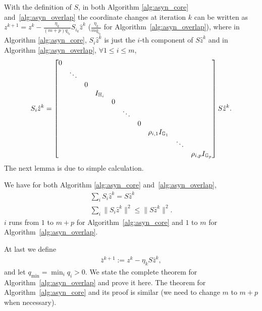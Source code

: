 {With the definition of $S$, in both Algorithm \ref{alg:asyn_core} and~\ref{alg:asyn_overlap} the coordinate changes at iteration $k$ can be written as $z^{k+1}=z^k-\frac{\eta_k}{(m+p)q_{i_k}}S_{i_k}\hat{z}^k$ ($\frac{\eta_k}{mq_{i_k}}$ for Algorithm~\ref{alg:asyn_overlap}), where in Algorithm \ref{alg:asyn_core}, $S_{i}\hat{z}^k$ is just the $i$-th component of $S\hat{z}^k$ and in Algorithm \ref{alg:asyn_overlap}, $\forall 1\leq i\leq m$,
$$S_{i}\hat{z}^k=\begin{bmatrix}
0&&&&&&&&&\\
&\ddots&&&&&&&&\\
&&0&&&&&&&\\
&&&I_{\HH_i}&&&&&&\\
&&&&0&&&&&\\
&&&&&\ddots&&&&\\
&&&&&&0&&&\\
&&&&&&&\rho_{i,1}I_{\GG_1}&&\\
&&&&&&&&\ddots&\\
&&&&&&&&&\rho_{i,p}I_{\GG_p}
\end{bmatrix}S\hat{z}^k.$$
The next lemma is due to simple calculation.
\begin{lemma}
We have for both Algorithm \ref{alg:asyn_core} and~\ref{alg:asyn_overlap},
\begin{align*}
\sum_{i}S_i\hat{z}^k=S\hat{z}^k\\
\sum_{i}\|S_i\hat{z}^k\|^2\leq\|S\hat{z}^k\|^2.
\end{align*}
$i$ runs from $1$ to $m+p$ for Algorithm~\ref{alg:asyn_core} and $1$ to $m$ for Algorithm~\ref{alg:asyn_overlap}.
\end{lemma}
At last we define
\begin{align}\label{eqn:def_bar_x}
\bar{z}^{k+1} := z^k - \eta_k S\hat{z}^{k},
\end{align}
and let $q_{\min}=\min_iq_i>0$. 
We state the complete theorem for Algorithm~\ref{alg:asyn_overlap} and prove it here. The theorem for Algorithm~\ref{alg:asyn_core} and its proof is similar (we need to change $m$ to $m+p$ when necessary).

}
